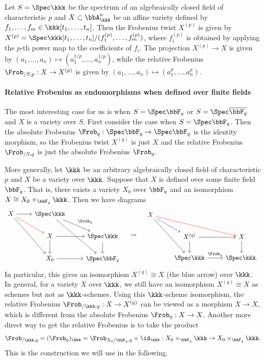 \begin{example}
	Let $S = \Spec \kkk$ be the spectrum of an algebraically closed field of characteristic $p$ and $X \subset \bbA^n_\kkk$ be an affine variety defined by $f_1, \dots, f_m \in \kkk[t_1, \dots, t_n]$.
	Then the Frobenius twist $X^{(p)}$ is given by $X^{(p)} = \Spec \kkk[t_1, \dots, t_n]/(f_1^{(p)}, \dots, f_m^{(p)})$, where $f_i^{(p)}$ is obtained by applying the $p$-th power map to the coefficients of $f_i$.
	The projection $X^{(p)} \to X$ is given by $(a_1, \dots, a_n) \mapsto (a_1^{1/p}, \dots, a_n^{1/p})$, while the relative Frobenius $\Frob_{/S,p}: X \to X^{(p)}$ is given by $(a_1, \dots, a_n) \mapsto (a_1^p, \dots, a_n^p)$.
\end{example}

\paragraph{Relative Frobenius as endomorphisms when defined over finite fields}
The most interesting case for us is when $S = \Spec \bbF_q$ or $S = \Spec \overline{\bbF_q}$ and $X$ is a variety over $S$.
First consider the case when $S = \Spec \bbF_q$.
Then the absolute Frobenius $\Frob_q: \Spec \bbF_q \to \Spec \bbF_q$ is the identity morphism, so the Frobenius twist $X^{(q)}$ is just $X$ and the relative Frobenius $\Frob_{/S,q}$ is just the absolute Frobenius $\Frob_q$.

More generally, let $\kkk$ be an arbitrary algebraically closed field of characteristic $p$ and $X$ be a variety over $\kkk$.
Suppose that $X$ is defined over some finite field $\bbF_q$.
That is, there exists a variety $X_0$ over $\bbF_q$ and an isomorphism $X \cong X_0 \times_{\bbF_q} \kkk$.
Then we have diagrams
\[
	\begin{tikzcd}
		X \arrow[r] \arrow[rdd] \arrow[rd, red] & \Spec \kkk \arrow[rd, "\Frob_q"] \arrow[rdd] & \\
		& X \arrow[r] \arrow[d] & \Spec \kkk \arrow[d] \\
		& X_0 \arrow[r] & \Spec \bbF_q
	\end{tikzcd}
	\quad \leadsto \quad
	\begin{tikzcd}
		X \arrow[rrd, red] \arrow[rdd] \arrow[rd, blue] & & \\
		& X^{(q)} \arrow[r] \arrow[d] & X \arrow[d] \\
		& \Spec \kkk \arrow[r, "\Frob_q"] & \Spec \kkk.
	\end{tikzcd}
\]
In particular, this gives an isomorphism $X^{(q)} \cong X$ (the blue arrow) over $\kkk$.
In general, for a variety $X$ over $\kkk$, we still have an isomorphism $X^{(q)} \cong X$ as schemes but not as $\kkk$-schemes.
Using this $\kkk$-scheme isomorphism, the relative Frobenius $\Frob_{/\kkk,q}: X \to X^{(q)}$ can be viewed as a morphism $X \to X$, which is different from the absolute Frobenius $\Frob_q: X \to X$.
Another more direct way to get the relative Frobenius is to take the product
\[ \Frob_{/\kkk,q} = (\Frob_{q})_\kkk = \Frob_{X_0/\bbF_q, q} \times \id_\kkk: X_0 \times_{\bbF_q} \kkk \to X_0 \times_{\bbF_q} \kkk. \]
This is the construction we will use in the following.

